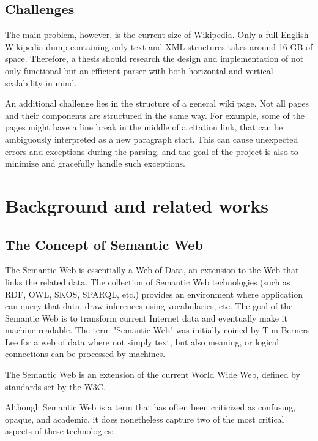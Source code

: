 \documentclass[thesis=M,english,hidelinks]{FITthesis}[2019/12/23]
\begin{document}
\begin{introduction}
  \section{Challenges}
	The main problem, however, is the current size of Wikipedia. Only a full English Wikipedia dump containing only text and XML structures takes around 16 GB of space. Therefore, a thesis should research the design and implementation of not only functional but an efficient parser with both horizontal and vertical scalability in mind.

	An additional challenge lies in the structure of a general wiki page. Not all pages and their components are structured in the same way. For example, some of the pages might have a line break in the middle of a citation link, that can be ambiguously interpreted as a new paragraph start. This can cause unexpected errors and exceptions during the parsing, and the goal of the project is also to minimize and gracefully handle such exceptions.
	
\end{introduction}

\chapter{Background and related works}

\section{The Concept of Semantic Web}

The Semantic Web is essentially a Web of Data, an extension to the Web that links the related data. The collection of Semantic Web technologies (such as \gls{RDF}, \gls{OWL}, \gls{SKOS}, \gls{SPARQL}, etc.) provides an environment where application can query that data, draw inferences using vocabularies, etc. The goal of the Semantic Web is to transform current Internet data and eventually make it machine-readable. The term "Semantic Web" was initially coined by Tim Berners-Lee\cite{Berners_QA} for a web of data where not simply text, but also meaning, or logical connections can be processed by machines.

The Semantic Web is an extension of the current World Wide Web, defined by standards set by the \gls{W3C}.

Although Semantic Web is a term that has often been criticized as confusing, opaque, and academic, it does nonetheless capture two of the most critical aspects of these technologies:
\end{document}
